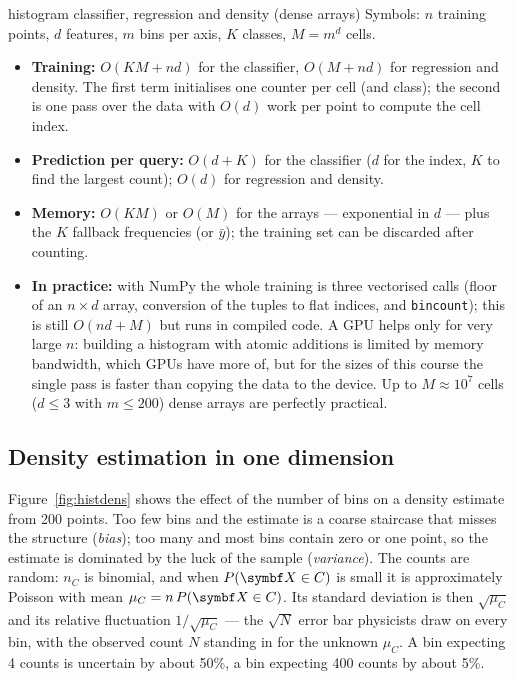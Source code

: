 \documentclass[11pt]{article}
\begin{document}
\begin{runtime}{histogram classifier, regression and density (dense arrays)}
Symbols: $n$ training points, $d$ features, $m$ bins per axis, $K$ classes, $M = m^d$ cells.
\begin{itemize}[leftmargin=1.2em]
\item \textbf{Training:} $O(KM + nd)$ for the classifier, $O(M + nd)$ for regression and density. The first term
initialises one counter per cell (and class); the second is one pass over the data with $O(d)$ work per point to
compute the cell index.
\item \textbf{Prediction per query:} $O(d + K)$ for the classifier ($d$ for the index, $K$ to find the largest
count); $O(d)$ for regression and density.
\item \textbf{Memory:} $O(KM)$ or $O(M)$ for the arrays --- exponential in $d$ --- plus the $K$ fallback frequencies
(or $\bar y$); the training set can be discarded after counting.
\item \textbf{In practice:} with NumPy the whole training is three vectorised calls (floor of an $n \times d$ array,
conversion of the tuples to flat indices, and \texttt{bincount}); this is still $O(nd + M)$ but runs in compiled
code. A GPU helps only for very large $n$: building a histogram with atomic additions is limited by memory
bandwidth, which GPUs have more of, but for the sizes of this course the single pass is faster than copying the data
to the device. Up to $M \approx 10^7$
cells ($d \le 3$ with $m \le 200$) dense arrays are perfectly practical.
\end{itemize}
\end{runtime}

\subsection{Density estimation in one dimension}

Figure~\ref{fig:histdens} shows the effect of the number of bins on a density estimate from 200 points. Too few bins
and the estimate is a coarse staircase that misses the structure (\emph{bias}); too many and most bins contain zero or
one point, so the estimate is dominated by the luck of the sample (\emph{variance}). The counts are random: $n_C$ is
binomial, and when $P(\X \in C)$ is small it is approximately Poisson with mean $\mu_C = n\,P(\X \in C)$. Its
standard deviation is then $\sqrt{\mu_C}$ and its relative fluctuation $1/\sqrt{\mu_C}$ --- the $\sqrt N$ error bar
physicists draw on every bin, with the observed count $N$ standing in for the unknown $\mu_C$. A bin expecting 4
counts is uncertain by about 50\%, a bin expecting 400 counts by about 5\%.
\end{document}
